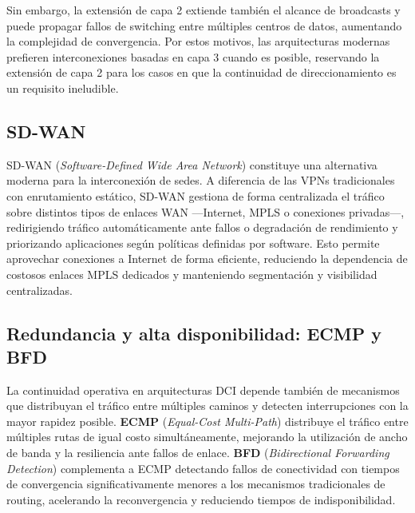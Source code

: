 Sin embargo, la extensión de capa 2 extiende también el alcance de broadcasts y puede propagar fallos de switching entre múltiples centros de datos, aumentando la complejidad de convergencia. Por estos motivos, las arquitecturas modernas prefieren interconexiones basadas en capa 3 cuando es posible, reservando la extensión de capa 2 para los casos en que la continuidad de direccionamiento es un requisito ineludible.

\subsection{SD-WAN}

SD-WAN (\textit{Software-Defined Wide Area Network}) constituye una alternativa moderna para la interconexión de sedes. A diferencia de las VPNs tradicionales con enrutamiento estático, SD-WAN gestiona de forma centralizada el tráfico sobre distintos tipos de enlaces WAN —Internet, MPLS o conexiones privadas—, redirigiendo tráfico automáticamente ante fallos o degradación de rendimiento y priorizando aplicaciones según políticas definidas por software. Esto permite aprovechar conexiones a Internet de forma eficiente, reduciendo la dependencia de costosos enlaces MPLS dedicados y manteniendo segmentación y visibilidad centralizadas.

\subsection{Redundancia y alta disponibilidad: ECMP y BFD}

La continuidad operativa en arquitecturas DCI depende también de mecanismos que distribuyan el tráfico entre múltiples caminos y detecten interrupciones con la mayor rapidez posible. \textbf{ECMP} (\textit{Equal-Cost Multi-Path}) distribuye el tráfico entre múltiples rutas de igual costo simultáneamente, mejorando la utilización de ancho de banda y la resiliencia ante fallos de enlace. \textbf{BFD} (\textit{Bidirectional Forwarding Detection}) complementa a ECMP detectando fallos de conectividad con tiempos de convergencia significativamente menores a los mecanismos tradicionales de routing, acelerando la reconvergencia y reduciendo tiempos de indisponibilidad.
